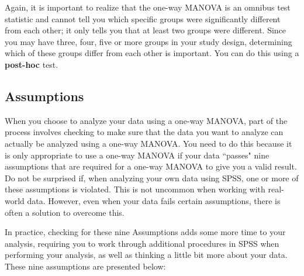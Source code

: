 \documentclass[12pt]{article} %
\begin{document}
Again, it is important to realize that the one-way MANOVA is an omnibus test statistic and cannot tell you which specific groups were significantly different from each other; it only tells you that at least two groups were different. Since you may have three, four, five or more groups in your study design, determining which of these groups differ from each other is important. You can do this using a \textbf{post-hoc} test.


\subsection{Assumptions}
When you choose to analyze your data using a one-way MANOVA, part of the process involves checking to make sure that the data you want to analyze can actually be analyzed using a one-way MANOVA. You need to do this because it is only appropriate to use a one-way MANOVA if your data ``passes" nine assumptions that are required for a one-way MANOVA to give you a valid result. Do not be surprised if, when analyzing your own data using SPSS, one or more of these assumptions is violated. This is not uncommon when working with real-world data. However, even when your data fails certain assumptions, there is often a solution to overcome this.

In practice, checking for these nine Assumptions adds some more time to your analysis, requiring you to work through additional procedures in SPSS when performing your analysis, as well as thinking a little bit more about your data. These nine assumptions are presented below:
\end{document}
